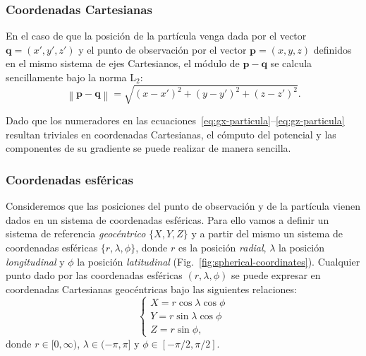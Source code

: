 \subsubsection{Coordenadas Cartesianas}

En el caso de que la posición de la partícula venga dada por el vector
$\mathbf{q} = (x', y', z')$ y el punto de observación por el vector
$\mathbf{p} = (x, y, z)$ definidos en el mismo sistema de ejes Cartesianos, el
módulo de
$\mathbf{p} - \mathbf{q}$ se calcula sencillamente bajo la norma L$_2$:
%
\begin{equation}
    \left\lVert  \mathbf{p} - \mathbf{q}  \right\rVert = \sqrt{
        (x - x')^2 + (y - y')^2 + (z - z')^2
    }.
\end{equation}

Dado que los numeradores en las
ecuaciones~\ref{eq:gx-particula}--\ref{eq:gz-particula} resultan triviales en
coordenadas Cartesianas, el cómputo del potencial y las componentes de su
gradiente se puede realizar de manera sencilla.

\subsubsection{Coordenadas esféricas}

Consideremos que las posiciones del punto de observación y de la partícula
vienen dados en un sistema de coordenadas esféricas. Para ello vamos a definir
un sistema de referencia \emph{geocéntrico} $\{X, Y, Z\}$ y a partir del mismo
un sistema de coordenadas esféricas $\{r, \lambda, \phi\}$, donde $r$ es la
posición \emph{radial}, $\lambda$ la posición \emph{longitudinal} y $\phi$ la
posición \emph{latitudinal} (Fig.~\ref{fig:spherical-coordinates}).
Cualquier punto dado por las coordenadas esféricas $(r, \lambda, \phi)$ se
puede expresar en coordenadas Cartesianas geocéntricas bajo las siguientes
relaciones:
%
\begin{equation}
    \begin{cases}
        X = r \cos\lambda \cos{\phi} \\
        Y = r \sin\lambda \cos{\phi} \\
        Z = r \sin{\phi},
    \end{cases}
\end{equation}
%
donde $r \in [0, \infty)$, $\lambda \in (-\pi, \pi]$ y
$\phi \in [-\pi/2, \pi/2]$.

